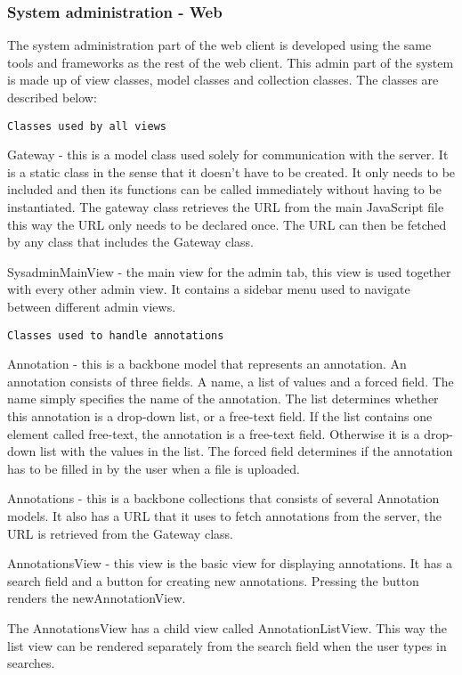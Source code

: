 \subsubsection{System administration - Web}
The system administration part of the web client is developed using the same tools and frameworks as the rest of the web client.
This admin part of the system is made up of view classes, model classes and collection classes. The classes are described below:

\texttt{Classes used by all views}

Gateway - this is a model class used solely for communication with the server. It is a static class in the sense that it doesn't have to be created. It only needs to be included and then its functions can be called immediately without having to be instantiated. The gateway class retrieves the URL from the main JavaScript file this way the URL only needs to be declared once. The URL can then be fetched by any class that includes the Gateway class.

SysadminMainView - the main view for the admin tab, this view is used together with every other admin view. It contains a sidebar menu used to navigate between different admin views.

\texttt{Classes used to handle annotations}

Annotation - this is a backbone model that represents an annotation. An annotation consists of three fields. A name, a list of values and a forced field. The name simply specifies the name of the annotation. The list determines whether this annotation is a drop-down list, or a free-text field. If the list contains one element called free-text, the annotation is a free-text field. Otherwise it is a drop-down list with the values in the list. The forced field determines if
the annotation has to be filled in by the user when a file is uploaded.

Annotations - this is a backbone collections that consists of several Annotation models. It also has a URL that it uses to fetch annotations from the server, the URL is retrieved from the Gateway class. 

AnnotationsView - this view is the basic view for displaying annotations. It has a search field and a button for creating new annotations. Pressing the button renders the newAnnotationView. 

The AnnotationsView has a child view called AnnotationListView. This way the list view can be rendered separately from the search field when the user types in searches. 

